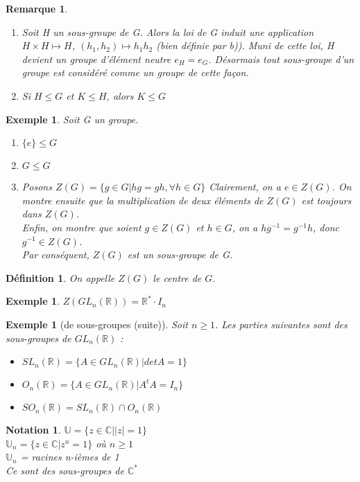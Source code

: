 \documentclass[a4paper, oneside]{report}
\theoremstyle{break}
\newtheorem{defi}[thm]{Définition}
\newtheorem{nota}[thm]{Notation}
\newtheorem{exem}[thm]{Exemple}
\newtheorem{remar}[thm]{Remarque}
\newcommand{\x}{\times}
\newcommand{\R}{\mathbb{R}}
\newcommand{\C}{\mathbb{C}}
\newcommand{\U}{\mathbb{U}}
\begin{document}
\begin{remar}
	\begin{enumerate}
		\item Soit H un sous-groupe de G. Alors la loi de G induit une application $H\x H \mapsto H$, $(h_1,h_2)\mapsto h_1h_2$ (bien définie par b)). Muni de cette loi, H devient un groupe d'élément neutre $e_H=e_G$. Désormais tout sous-groupe d'un groupe est considéré comme un groupe de cette façon.
		\item Si $H\leq G$ et $K\leq H$, alors $K\leq G$
	\end{enumerate}
\end{remar}

\begin{exem}
	Soit G un groupe.
	
	\begin{enumerate}
		\item $\{e\} \leq G$
		\item $G\leq G$
		\item Posons $Z(G)=\{g\in G | hg=gh, \forall h\in G \}$
		Clairement, on a $e\in Z(G)$. On montre ensuite que la multiplication de deux éléments de $Z(G)$ est toujours dans $Z(G)$.\\
		Enfin, on montre que soient $g\in Z(G)$ et $h\in G$, on a $hg^{-1}=g^{-1}h$, donc $g^{-1}\in Z(G)$.\\
		Par conséquent, $Z(G)$ est un sous-groupe de G.
	\end{enumerate}
\end{exem}

\begin{defi}
	On appelle $Z(G)$ le centre de $G$.
\end{defi}

\begin{exem}
	$Z(GL_n(\R)) = \R^* \cdot I_n$
\end{exem}

\begin{exem}[de sous-groupes (suite)]
	Soit $n\geq 1$. Les parties suivantes sont des sous-groupes de $GL_n(\R)$ :
	\begin{itemize}
		\item $SL_n(\R)=\{A\in GL_n(\R) | det A=1 \}$
		\item $O_n(\R) = \{A\in GL_n(\R) | A^tA=I_n \}$
		\item $SO_n(\R) = SL_n(\R) \cap O_n(\R)$
	\end{itemize}
\end{exem}

\begin{nota}
	$\U = \{z\in \C | |z|=1 \}$\\
	$\U_n = \{z\in \C | z^n =1 \}$ où $n\geq 1$\\
	$\U_n$ = {racines n-ièmes de 1}\\
	Ce sont des sous-groupes de $\C^*$\\
\end{nota}
\end{document}
